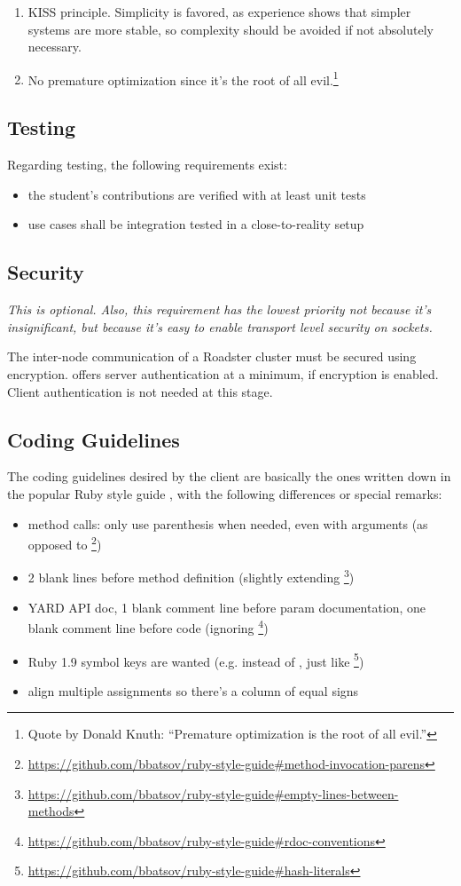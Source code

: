 \begin{enumerate}
\item \gls{KISS} principle. Simplicity is favored, as experience shows that
	simpler systems are more stable, so complexity should be avoided if not
	absolutely necessary.

\item No premature optimization since it's the root of all evil.\footnote{Quote
	by Donald Knuth: ``Premature optimization is the root of all evil.''}
\end{enumerate}


\subsection{Testing}
Regarding testing, the following requirements exist:
\begin{itemize}
	\item the student's contributions are verified with at least unit tests
	\item use cases shall be integration tested in a close-to-reality setup
\end{itemize}

\subsection{Security}
\emph{This is optional. Also, this requirement has the lowest priority not
because it's insignificant, but because it's easy to enable transport level
security on \zmq sockets.}

The inter-node communication of a Roadster cluster must be secured using
encryption. \zmq offers server authentication at a minimum, if encryption is
enabled. Client authentication is not needed at this stage.

\subsection{Coding Guidelines}
The coding guidelines desired by the client are basically the ones written down
in the popular Ruby style guide \cite{rb:style-guide}, with the following
differences or special remarks:

\begin{itemize}
	\item method calls: only use parenthesis when needed, even with arguments (as opposed to \footnote{\url{https://github.com/bbatsov/ruby-style-guide\#method-invocation-parens}})
	\item 2 blank lines before method definition (slightly extending \footnote{\url{https://github.com/bbatsov/ruby-style-guide\#empty-lines-between-methods}})
	\item YARD API doc, 1 blank comment line before param documentation, one blank comment line before code (ignoring \footnote{\url{https://github.com/bbatsov/ruby-style-guide\#rdoc-conventions}})
	\item Ruby 1.9 symbol keys are wanted (e.g.  instead of , just like \footnote{\url{https://github.com/bbatsov/ruby-style-guide\#hash-literals}})
	\item align multiple assignments so there's a column of equal signs
\end{itemize}
